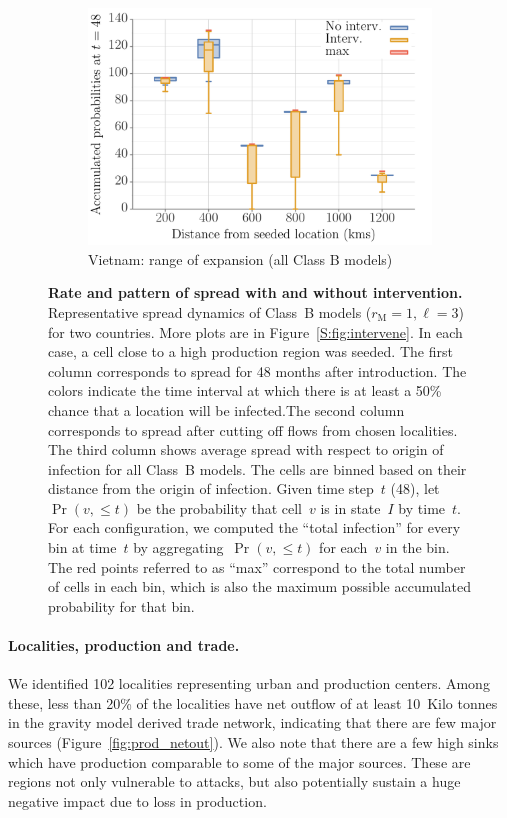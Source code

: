 \documentclass[11pt]{article}
\newcommand{\mooreRange}{r_\mathrm{M}}
\theoremstyle{definition}
\begin{document}
\begin{figure}[ht]
\begin{subfigure}[b]{.43\textwidth}
\includegraphics[width=\textwidth]{../cellular_automata/results/dist_inf_plots/VN_dist_prob_B_box.pdf}
\caption{Vietnam: range of expansion (all Class B models)\label{fig:vnmBContourBox}}
\end{subfigure}
\caption{\textbf{Rate and pattern of spread with and without intervention.}
Representative spread dynamics of Class~B models ($\mooreRange=1, \ell=3$)
for two countries. More plots are in Figure~\ref{S:fig:intervene}. In each
case, a cell close to a high production region was seeded. The first column
corresponds to spread for 48 months after introduction. The colors indicate
the time interval at which there is at least a 50\% chance that a location
will be infected.The second column corresponds to spread after cutting off
flows from chosen localities. The third column shows average spread with
respect to origin of infection for all Class~B models. The cells are binned
based on their distance from the origin of infection. Given time step~$t$
(48), let $\Pr(v,\le t)$ be the probability that cell~$v$ is in state~$I$
by time~$t$. For each configuration, we computed the ``total
infection'' for every bin at time~$t$ by aggregating~$\Pr(v,\le t)$ for
each~$v$ in the bin. The red points referred to as ``max'' correspond to
the total number of cells in each bin, which is also the maximum possible
accumulated probability for that bin.
\label{fig:spread}}
\end{figure}

\paragraph{Localities, production and trade.}
We identified 102 localities representing urban and production centers.
Among these, less than 20\% of the localities have net outflow of at least
10~Kilo tonnes in the gravity model derived trade network, indicating that
there are few major sources (Figure~\ref{fig:prod_netout}).  We also note
that there are a few high sinks which have production comparable to some of
the major sources. These are regions not only vulnerable to attacks, but
also potentially sustain a huge negative impact due to loss in production.
\end{document}
